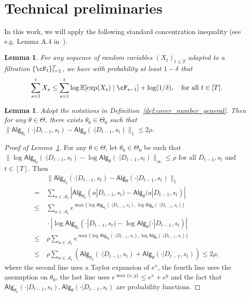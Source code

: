 \documentclass[10pt]{article}
\newtheorem{lemma}[theorem]{Lemma}
\newcommand{\<}{\left\langle}
\renewcommand{\>}{\right\rangle}
\newcommand{\E}{\mathbb{E}}
\newcommand{\state}{{s}}
\newcommand{\action}{{a}}
\newcommand{\totlen}{{T}}
\newcommand{\sAlg}{{\mathsf{Alg}}}
\newcommand{\dset}{{D}}
\newcommand{\Par}{{\theta}}
\newcommand{\Parspace}{{\Theta}}
\newcommand{\actionsp}{{\mathcal{A}}}
\begin{document}
\section{Technical preliminaries}
In this work, we will apply the following standard concentration inequality (see e.g. Lemma A.4 in~\cite{foster2021statistical}).
\begin{lemma}\label{lm:exp_concen}
    For any sequence of random variables $(X_t)_{t\leq T}$ adapted to a filtration $\{\cF_{t}\}_{t=1}^T$, we have with probability at least $1-\delta$ that
    \begin{align*}
        \sum_{s=1}^t X_s\leq \sum_{s=1}^t\log\E[\exp(X_s)\mid\cF_{s-1}]+\log(1/\delta),~~~\text{for all } t\in[T].
    \end{align*}
\end{lemma}
\begin{lemma}\label{lm:cover_num_corr}
   Adopt the notations in Definition~\ref{def:cover_number_general}. Then for any $\Par\in\Parspace$, there exists $\Par_0\in\Parspace_0$ such that $\| \sAlg_{\Par_0}(\cdot|\dset_{t-1},\state_t)-\sAlg_{\Par}(\cdot|\dset_{t-1},\state_t)\|_{1}\leq 2\rho$.
\end{lemma}
\begin{proof}[Proof of Lemma~\ref{lm:cover_num_corr}]
For any $\Par\in\Parspace$, let $\Par_0\in\Parspace_0$ be such that $\|\log \sAlg_{\Par_0}(\cdot|\dset_{t-1},\state_t)-\log \sAlg_{\Par}(\cdot|\dset_{t-1},\state_t)\|_{\infty}\leq\rho$ for all $\dset_{t-1},\state_t$ and $t\in[\totlen]$. Then
\begin{align*}
   &~\| \sAlg_{\Par_0}(\cdot|\dset_{t-1},\state_t)-\sAlg_{\Par}(\cdot|\dset_{t-1},\state_t)\|_{1}\\
   =&~
   \sum_{\action\in\actionsp_t}|\sAlg_{\Par_0}(\action|\dset_{t-1},\state_t)-\sAlg_{\Par}(\action|\dset_{t-1},\state_t)|\\
   \leq &~
   \sum_{\action\in\actionsp_t}e^{\max\{\log\sAlg_{\Par_0}(\cdot|\dset_{t-1},\state_t),\log\sAlg_{\Par}(\cdot|\dset_{t-1},\state_t)\}}\\
   &~\cdot|\log\sAlg_{\Par_0}(\cdot|\dset_{t-1},\state_t)-\log\sAlg_{\Par}(\cdot|\dset_{t-1},\state_t)|\\
   \leq&~\rho \sum_{\action\in\actionsp_t}e^{\max\{\log\sAlg_{\Par_0}(\cdot|\dset_{t-1},\state_t),\log\sAlg_{\Par}(\cdot|\dset_{t-1},\state_t)\}}\\
   \leq&~ \rho \sum_{\action\in\actionsp_t} (\sAlg_{\Par_0}(\cdot|\dset_{t-1},\state_t)+\sAlg_{\Par}(\cdot|\dset_{t-1},\state_t))\leq 2\rho,
\end{align*}
where the second line uses a Taylor expansion of $e^x$, the fourth line uses the assumption on $\Par_0$, the last line uses $e^{\max\{x,y\}}\leq e^x+e^y$ and the fact that $\sAlg_{\Par_0}(\cdot|\dset_{t-1},\state_t),\sAlg_{\Par}(\cdot|\dset_{t-1},\state_t)$ are probability functions.
\end{proof}
\end{document}
